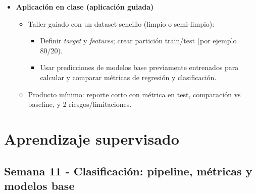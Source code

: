 \documentclass{article}
\begin{document}
\begin{itemize}
\item \textbf{Aplicación en clase (aplicación guiada)}
\begin{itemize}
  \item Taller guiado con un dataset sencillo (limpio o semi-limpio):
  \begin{itemize}
    \item Definir \textit{target} y \textit{features}; crear partición train/test (por ejemplo 80/20).
    \item Usar predicciones de modelos base previamente entrenados para calcular y comparar métricas de regresión y clasificación.
  \end{itemize}
  \item Producto mínimo: reporte corto con métrica en test, comparación vs baseline, y 2 riesgos/limitaciones.
\end{itemize}
\end{itemize}

\newpage
\section{Aprendizaje supervisado}

\subsection{Semana 11 - Clasificación: pipeline, métricas y modelos base}
\vspace{0.2 cm}
\end{document}
